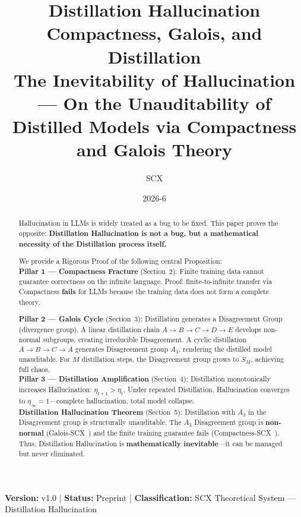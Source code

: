 \documentclass[12pt,a4paper]{article}
\title{\textbf{Distillation Hallucination}\\[4pt]
\large Compactness, Galois, and Distillation\\[2pt]
\small The Inevitability of Hallucination --- On the Unauditability of\\Distilled Models via Compactness and Galois Theory}
\author{SCX}
\date{2026-6}
\theoremstyle{remark}
\begin{document}
\maketitle
\begin{center}
\footnotesize
\textbf{Version: } v1.0 \quad | \quad
\textbf{Status:} Preprint \quad | \quad
\textbf{Classification:} SCX Theoretical System --- Distillation Hallucination
\end{center}
\begin{abstract}
Hallucination in LLMs is widely treated as a bug to be fixed. This paper proves the opposite: \textbf{Distillation Hallucination is not a bug, but a mathematical necessity of the Distillation process itself.}

We provide a Rigorous Proof of the following central Proposition: \\[4pt]
\textbf{Pillar 1 --- Compactness Fracture} (Section~2): Finite training data cannot guarantee correctness on the infinite language. Proof: finite-to-infinite transfer via Compactness \textbf{fails} for LLMs because the training data does not form a complete theory.

\textbf{Pillar 2 --- Galois Cycle} (Section~3): Distillation generates a Disagreement Group (divergence group). A linear distillation chain \(A \to B \to C \to D \to E\) develops non-normal subgroups, creating irreducible Disagreement. A cyclic distillation \(A \to B \to C \to A\) generates Disagreement group \(A_3\), rendering the distilled model unauditable. For \(M\) distillation steps, the Disagreement group grows to \(S_M\), achieving full chaos.\\[4pt]

\textbf{Pillar 3 --- Distillation Amplification} (Section~4): Distillation monotonically increases Hallucination: \(\eta_{t+1} > \eta_t\). Under repeated Distillation, Hallucination converges to \(\eta_{\infty} = 1\)---complete hallucination, total model collapse.\\[4pt]

\textbf{Distillation Hallucination Theorem} (Section~5): Distillation with \(A_3\) in the Disagreement group is structurally unauditable. The \(A_3\) Disagreement group is \textbf{non-normal} (Galois-SCX~\cite{scx_galois}) and the finite training guarantee fails (Compactness-SCX~\cite{scx_compactness}). Thus, Distillation Hallucination is \textbf{mathematically inevitable}---it can be managed but never eliminated.


\end{abstract}
\end{document}

